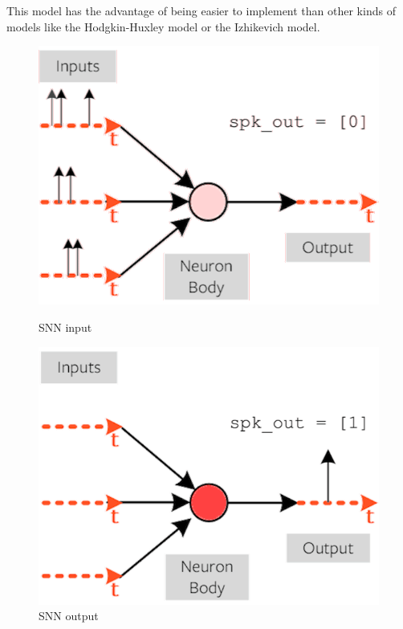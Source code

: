 \documentclass[11pt]{article}
\begin{document}
This model has the advantage of being easier to implement than other kinds of models like the Hodgkin-Huxley model or the Izhikevich model.


\begin{figure}[h]
  \centering
  \begin{minipage}{0.45\textwidth}
    \centering
    \includegraphics[width=1\textwidth]{image/def1.png}
    \caption{SNN input}
  \end{minipage}\hfill
  \begin{minipage}{0.45\textwidth}
    \centering
    \includegraphics[width=1\textwidth]{image/def2.png}
    \caption{SNN output}
  \end{minipage}
\end{figure}
\end{document}
